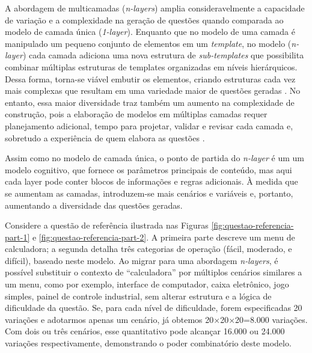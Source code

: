 A abordagem de multicamadas (\textit{n-layers}) amplia consideravelmente a capacidade de variação e a complexidade na geração de questões quando comparada ao modelo de camada única (\textit{1-layer}).  Enquanto que no modelo de uma camada é manipulado um pequeno conjunto de elementos em um \textit{template}, no modelo (\textit{n-layer}) cada camada adiciona uma nova estrutura de \textit{sub-templates} que possibilita combinar múltiplas estruturas de templates organizadas em níveis hierárquicos. Dessa forma, torna-se viável embutir os elementos, criando estruturas cada vez mais complexas que resultam em uma variedade maior  de questões geradas  \parencite{lai2013}. No entanto, essa maior diversidade traz também um aumento na complexidade de construção, pois a elaboração de modelos em múltiplas camadas requer planejamento adicional, tempo para projetar, validar e revisar cada camada e, sobretudo a experiência de quem elabora as questões \parencite{gierl2021}. 

Assim como no modelo de camada única, o ponto de partida do \textit{n-layer} é um um modelo cognitivo, que fornece os parâmetros principais de conteúdo, mas aqui cada layer pode conter blocos de informações e regras adicionais. À medida que se aumentam as camadas, introduzem-se mais cenários e variáveis e, portanto, aumentando a diversidade das questões geradas.


Considere a questão de referência ilustrada nas Figuras \ref{fig:questao-referencia-part-1} e \ref{fig:questao-referencia-part-2}. A primeira parte descreve um menu de calculadora; a segunda detalha três categorias de operação (fácil, moderado, e difícil), baseado neste modelo. Ao migrar para uma abordagem \textit{n‑layers}, é possível substituir o contexto de “calculadora” por múltiplos cenários similares a um menu, como por exemplo, interface de computador, caixa eletrônico, jogo simples, painel de controle industrial, sem alterar estrutura e a lógica de dificuldade da questão. Se, para cada nível de dificuldade, forem especificadas 20 variações e adotarmos apenas um cenário, já obtemos 20×20×20=8.000 variações. Com dois ou três cenários, esse quantitativo pode alcançar 16.000 ou 24.000 variações respectivamente, demonstrando o poder combinatório deste modelo.


